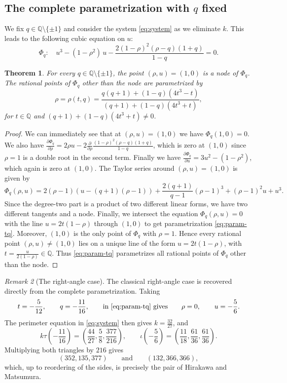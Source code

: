 \documentclass[11pt]{amsart}
\theoremstyle{plain}
\newtheorem{thm}{Theorem}[section]
\theoremstyle{remark}
\newtheorem{rem}[thm]{Remark}
\theoremstyle{plain}
\newcommand{\Q}{\mathbb{Q}}
\begin{document}
\subsection{The complete parametrization with $q$ fixed}
We fix $q \in \Q\setminus \{\pm 1\}$ and consider the system \eqref{eq:system} as we eliminate $k$. This leads to the following cubic equation on $u$:
\begin{equation}\label{eq:Phiq}
  \Phi_{q}\colon\quad
  u^{3}-(1-\rho^{2})\,u-\frac{2(1-\rho)^{2}(\rho-q)(1+q)}{1-q}=0.
\end{equation}
\begin{thm}\label{thm:param}
For every $q\in\Q\setminus\{\pm1\}$, the point $(\rho,u)=(1,0)$ is a
node of $\Phi_q$. The rational points of $\Phi_q$ other than the node
are parametrized by
\begin{equation}\label{eq:param-tq}
  \rho=\rho(t,q)=\frac{q(q+1)+(1-q)(4t^{3}-t)}
                     {(q+1)+(1-q)(4t^{3}+t)},
\end{equation}
for $t\in \Q$ and $(q+1)+(1-q)(4t^3+t)\ne0$.
\end{thm}


\begin{proof} We can
immediately see that at $(\rho,u)=(1,0)$ we have
$\Phi_{q}(1,0)=0$. We also have $\frac{\partial\Phi_{q}}{\partial \rho}=2\rho u-2\frac{\partial}{\partial \rho}\frac{(1-\rho)^{2}(\rho-q)(1+q)}{1-q}$, which is zero at $(1,0)$ since $\rho=1$ is a double root in the second term. Finally we have $\frac{\partial\Phi_{q}}{\partial u}=3u^2-(1-\rho^2)$, which again is zero at $(1,0)$.
The Taylor series around $(\rho,u)=(1,0)$ is given by
\[\Phi_q(\rho,u)=2(\rho-1)(u-(q+1)(\rho-1))+\frac{2(q+1)}{q-1}(\rho-1)^3+(\rho-1)^2u+u^3.\]
Since the degree-two part is a product of two different linear forms,  we have two different tangents and a node. Finally, we intersect the equation $\Phi_q(\rho,u)=0$ with the line $u=2t(1-\rho)$ through $(1,0)$ to get parametrization \eqref{eq:param-tq}. Moreover, $(1,0)$ is the only point of $\Phi_q$ with $\rho=1$.
Hence every rational point $(\rho,u)\ne(1,0)$ lies on a unique line
of the form $u=2t(1-\rho)$, with
$t=\frac{u}{2(1-\rho)}\in\Q.$
Thus \eqref{eq:param-tq} parametrizes all rational points of
$\Phi_q$ other than the node.
\end{proof}
\begin{rem}[The right-angle case]\label{rem:right-angle}
The classical right-angle case is recovered directly from the complete
parametrization. Taking
\[
t=-\frac5{12},
\qquad
q=-\frac{11}{16},
\qquad
\mbox{in \eqref{eq:param-tq} gives}
\qquad
\rho=0,
\qquad
u=-\frac56.
\]
The perimeter equation in \eqref{eq:system} then gives
$k=\frac{32}{27}$, and
\[
k\tau\left(-\frac{11}{16}\right)
=
\left(
\frac{44}{27},\frac58,\frac{377}{216}
\right),
\qquad
\iota\left(-\frac56\right)
=
\left(
\frac{11}{18},\frac{61}{36},\frac{61}{36}
\right).
\]
Multiplying both triangles by $216$ gives
\[
(352,135,377)
\qquad\text{and}\qquad
(132,366,366),
\]
which, up to reordering of the sides, is precisely the pair of
Hirakawa and Matsumura.
\end{rem}
\end{document}
